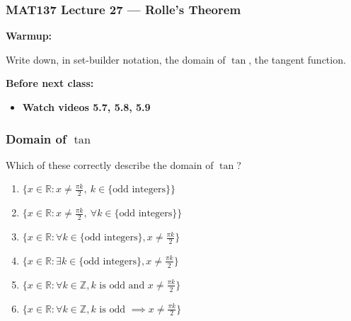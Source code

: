 \documentclass[14pt]{beamer}
\begin{document}
\begin{frame}
	\frametitle{MAT137 Lecture 27 --- Rolle's Theorem}

	{\bf Warmup:}

	Write down, in set-builder notation, the domain of $\tan$, the tangent function.

	\vfill
	{\bf Before next class:}
		\begin{itemize} \normalsize
			\item {\bf Watch videos  5.7, 5.8, 5.9}
		\end{itemize}
\end{frame}
	\begin{frame}[t]
		\frametitle{Domain of $\tan$}

		Which of these correctly describe the domain of $\tan$?
		\begin{enumerate}
			\item $\Big\{x\in\mathbb R: x\neq \tfrac{\pi k}{2},\ k\in\{\text{odd integers}\}\Big\}$
			\item $\Big\{x\in\mathbb R: x\neq \tfrac{\pi k}{2},\ \forall k\in\{\text{odd integers}\}\Big\}$
			\item $\Big\{x\in\mathbb R: \forall k\in\{\text{odd integers}\}, x\neq \tfrac{\pi k}{2} \Big\}$
			\item $\Big\{x\in\mathbb R: \exists k\in\{\text{odd integers}\}, x\neq \tfrac{\pi k}{2} \Big\}$
			\item $\Big\{x\in\mathbb R: \forall k\in\mathbb Z, k\text{ is odd and } x\neq \tfrac{\pi k}{2} \Big\}$
			\item $\Big\{x\in\mathbb R: \forall k\in\mathbb Z, k\text{ is odd }\implies x\neq \tfrac{\pi k}{2} \Big\}$
		\end{enumerate}

	\end{frame}
\end{document}
